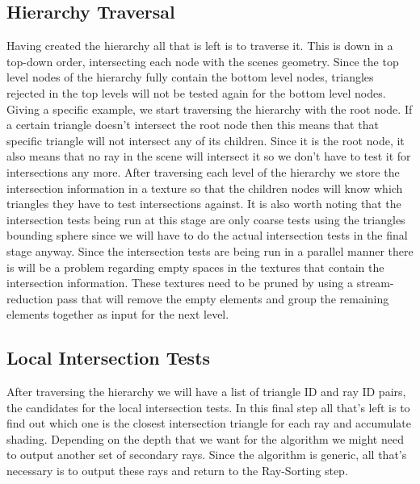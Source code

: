 \documentclass{llncs}
\begin{document}

%
\subsection{Hierarchy Traversal}
%

Having created the hierarchy all that is left is to traverse it. This is down in a top-down order, intersecting each node with the scenes geometry. Since the top level nodes of the hierarchy fully contain the bottom level nodes, triangles rejected in the top levels will not be tested again for the bottom level nodes. Giving a specific example, we start traversing the hierarchy with the root node. If a certain triangle doesn't intersect the root node then this means that that specific triangle will not intersect any of its children. Since it is the root node, it also means that no ray in the scene will intersect it so we don't have to test it for intersections any more. After traversing each level of the hierarchy we store the intersection information in a texture so that the children nodes will know which triangles they have to test intersections against. It is also worth noting that the intersection tests being run at this stage are only coarse tests using the triangles bounding sphere since we will have to do the actual intersection tests in the final stage anyway. Since the intersection tests are being run in a parallel manner there is will be a problem regarding empty spaces in the textures that contain the intersection information. These textures need to be pruned by using a stream-reduction pass \cite{RAHStream07} that will remove the empty elements and group the remaining elements together as input for the next level.


%
\subsection{Local Intersection Tests}
%

After traversing the hierarchy we will have a list of triangle ID and ray ID pairs, the candidates for the local intersection tests. In this final step all that's left is to find out which one is the closest intersection triangle for each ray and accumulate shading. Depending on the depth that we want for the algorithm we might need to output another set of secondary rays. Since the algorithm is generic, all that's necessary is to output these rays and return to the Ray-Sorting step.
\end{document}
